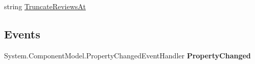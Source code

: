 \begin{DoxyCompactItemize}
\begin{DoxyCompactList}\small\item\em \end{DoxyCompactList}\item 
\hypertarget{class_price___comparison_1_1amazon_1_1ecs_1_1_item_search_request_a62af7d3b3ce449a005222ce22cac5704}{string \hyperlink{class_price___comparison_1_1amazon_1_1ecs_1_1_item_search_request_a62af7d3b3ce449a005222ce22cac5704}{Truncate\-Reviews\-At}}\label{class_price___comparison_1_1amazon_1_1ecs_1_1_item_search_request_a62af7d3b3ce449a005222ce22cac5704}

\begin{DoxyCompactList}\small\item\em \end{DoxyCompactList}\end{DoxyCompactItemize}
\subsection*{Events}
\begin{DoxyCompactItemize}
\item 
\hypertarget{class_price___comparison_1_1amazon_1_1ecs_1_1_item_search_request_a480d9a8f9124ddab402b06ecb4bee6f7}{System.\-Component\-Model.\-Property\-Changed\-Event\-Handler {\bfseries Property\-Changed}}\label{class_price___comparison_1_1amazon_1_1ecs_1_1_item_search_request_a480d9a8f9124ddab402b06ecb4bee6f7}

\end{DoxyCompactItemize}
